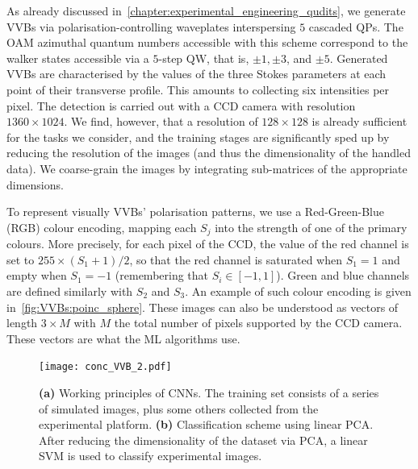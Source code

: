 As already discussed in~\cref{chapter:experimental_engineering_qudits}, we generate VVBs via polarisation-controlling waveplates interspersing $5$ cascaded QPs.
The OAM azimuthal quantum numbers accessible with this scheme correspond to the walker states accessible via a $5$-step QW, that is, $\pm1,\pm3$, and $\pm5$.
Generated VVBs are characterised by the values of the three Stokes parameters at each point of their transverse profile. This amounts to collecting six intensities per pixel. The detection is carried out with a \ac{CCD} camera with resolution $1360 \times 1024$. 
We find, however, that a resolution of $128 \times 128$ is already sufficient for the tasks we consider, and the training stages are significantly sped up by reducing the resolution of the images (and thus the dimensionality of the handled data). We coarse-grain the images by integrating sub-matrices of the appropriate dimensions.

To represent visually VVBs' polarisation patterns, we use a Red-Green-Blue (RGB) colour encoding, mapping each $S_j$ into the strength of one of the primary colours.
More precisely, for each pixel of the CCD, the value of the red channel is set to $255\times(S_1+1)/2$, so that the red channel is saturated when $S_1=1$ and empty when $S_1=-1$ (remembering that $S_i\in[-1,1]$). Green and blue channels are defined similarly with $S_2$ and $S_3$.
An example of such colour encoding is given in~\cref{fig:VVBs:poinc_sphere}.
These images can also be understood as vectors of length $3\times M$ with $M$ the total number of pixels supported by the CCD camera. These vectors are what the ML algorithms use.

\begin{figure}[tb]
	\centering
	\texttt{[image: conc\_VVB\_2.pdf]}
	\caption{
	\textbf{(a)}
	Working principles of \acp{CNN}. The training set consists of a series of simulated images, plus some others collected from the experimental platform.
	\textbf{(b)}
	Classification scheme using linear \ac{PCA}.
	After reducing the dimensionality of the dataset via \ac{PCA}, a linear \ac{SVM} is used to classify experimental images. 
	}
	\label{fig:VVBs:class_techniques}
\end{figure}

